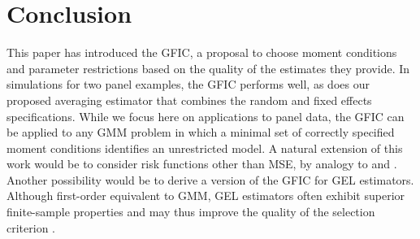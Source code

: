 
\section{Conclusion}
\label{sec:conclude}
This paper has introduced the GFIC, a proposal to choose moment conditions and parameter restrictions based on the quality of the estimates they provide. 
In simulations for two panel examples, the GFIC performs well, as does our proposed averaging estimator that combines the random and fixed effects specifications.
While we focus here on applications to panel data, the GFIC can be applied to any GMM problem in which a minimal set of correctly specified moment conditions identifies an unrestricted model. 
A natural extension of this work would be to consider risk functions other than MSE, by analogy to \cite{ClaeskensCroux2006} and \cite{ClaeskensHjort2008}.
Another possibility would be to derive a version of the GFIC for GEL estimators. 
Although first-order equivalent to GMM, GEL estimators often exhibit superior finite-sample properties and may thus improve the quality of the selection criterion \citep{NeweySmith}. 
